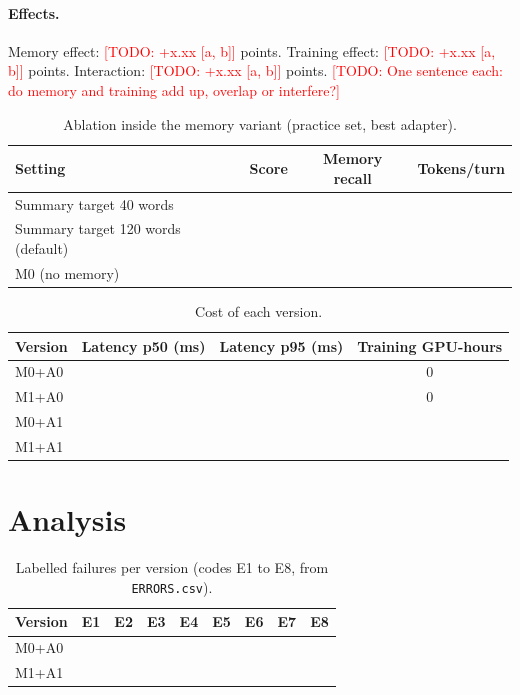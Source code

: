\documentclass[11pt]{article}
\newcommand{\groupid}{G34}
\newcommand{\todo}[1]{\textcolor{red}{[TODO: #1]}}
\begin{document}
\paragraph{Effects.} Memory effect: \todo{+x.xx [a, b]} points. Training effect: \todo{+x.xx [a, b]}
points. Interaction: \todo{+x.xx [a, b]} points. \todo{One sentence each: do memory and training add up,
overlap or interfere?}

\begin{table}[h]
\centering\small
\caption{Ablation inside the memory variant (practice set, best adapter).}
\label{tab:\groupid-ablation}
\begin{tabular}{lccc}
\toprule
Setting & Score & Memory recall & Tokens/turn \\
\midrule
Summary target 40 words & & & \\
Summary target 120 words (default) & & & \\
M0 (no memory) & & & \\
\bottomrule
\end{tabular}
\end{table}

\begin{table}[h]
\centering\small
\caption{Cost of each version.}
\label{tab:\groupid-cost}
\begin{tabular}{lccc}
\toprule
Version & Latency p50 (ms) & Latency p95 (ms) & Training GPU-hours \\
\midrule
M0+A0 & & & 0 \\
M1+A0 & & & 0 \\
M0+A1 & & & \\
M1+A1 & & & \\
\bottomrule
\end{tabular}
\end{table}

\section{Analysis}
\label{sec:\groupid-analysis}

\begin{table}[h]
\centering\small
\caption{Labelled failures per version (codes E1 to E8, from \texttt{ERRORS.csv}).}
\label{tab:\groupid-errors}
\begin{tabular}{lcccccccc}
\toprule
Version & E1 & E2 & E3 & E4 & E5 & E6 & E7 & E8 \\
\midrule
M0+A0 & & & & & & & & \\
M1+A1 & & & & & & & & \\
\bottomrule
\end{tabular}
\end{table}
\end{document}
